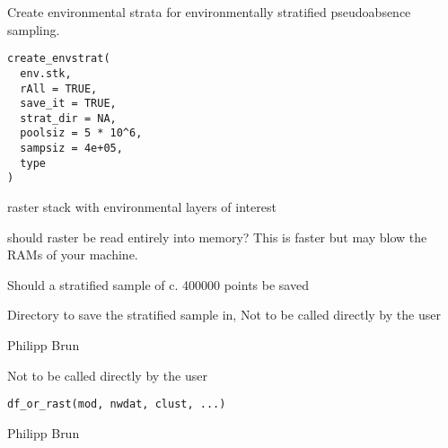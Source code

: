 \documentclass[a4paper]{book}
\begin{document}
%
\begin{Description}\relax
Create environmental strata for environmentally stratified pseudoabsence
sampling.
\end{Description}
%
\begin{Usage}
\begin{verbatim}
create_envstrat(
  env.stk,
  rAll = TRUE,
  save_it = TRUE,
  strat_dir = NA,
  poolsiz = 5 * 10^6,
  sampsiz = 4e+05,
  type
)
\end{verbatim}
\end{Usage}
%
\begin{Arguments}
\begin{ldescription}
\item[\code{env.stk}] raster stack with environmental layers of interest

\item[\code{rAll}] should raster be read entirely into memory? This is faster
but may blow the RAMs of your machine.

\item[\code{save\_it}] Should a stratified sample of c. 400000 points be saved

\item[\code{strat\_dir}] Directory to save the stratified sample in,
Not to be called directly by the user
\end{ldescription}
\end{Arguments}
%
\begin{Author}\relax
Philipp Brun
\end{Author}
%
\begin{Description}\relax
Not to be called directly by the user
\end{Description}
%
\begin{Usage}
\begin{verbatim}
df_or_rast(mod, nwdat, clust, ...)
\end{verbatim}
\end{Usage}
%
\begin{Author}\relax
Philipp Brun
\end{Author}
\end{document}
